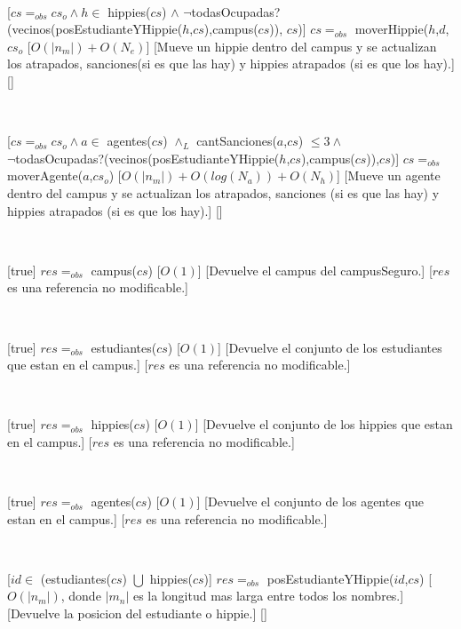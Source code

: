 ~

[$cs =_{obs} cs_o \land h \in$ hippies($cs$) $\land$ $\neg$todasOcupadas?(vecinos(posEstudianteYHippie($h$,$cs$),campus($cs$)), $cs$)]
{$cs =_{obs}$ moverHippie($h$,$d$,$cs_o$}
[$O(|n_m|) + O(N_e)$]
[Mueve un hippie dentro del campus y se actualizan los atrapados, sanciones(si es que las hay) y hippies atrapados (si es que los hay).]
[]

~

[$cs =_{obs} cs_o \land a \in$ agentes($cs$) $\land_L$ cantSanciones($a$,$cs$) $\leq 3 \land$ \\
$\neg$todasOcupadas?(vecinos(posEstudianteYHippie($h$,$cs$),campus($cs$)),$cs$)]
{$cs =_{obs}$ moverAgente($a$,$cs_o$)}
[$O(|n_m|) + O(log(N_a)) + O(N_h)$]
[Mueve un agente dentro del campus y se actualizan los atrapados, sanciones (si es que las hay) y hippies atrapados (si es que los hay).]
[]

~

[true]
{$res =_{obs}$ campus($cs$)}
[$O(1)$]
[Devuelve el campus del campusSeguro.]
[$res$ es una referencia no modificable.]

~

[true]
{$res =_{obs}$ estudiantes($cs$)}
[$O(1)$]
[Devuelve el conjunto de los estudiantes que estan en el campus.]
[$res$ es una referencia no modificable.]

~

[true]
{$res =_{obs}$ hippies($cs$)}
[$O(1)$]
[Devuelve el conjunto de los hippies que estan en el campus.]
[$res$ es una referencia no modificable.]

~

[true]
{$res =_{obs}$ agentes($cs$)}
[$O(1)$]
[Devuelve el conjunto de los agentes que estan en el campus.]
[$res$ es una referencia no modificable.]

~

[$id \in$ (estudiantes($cs$) $\bigcup$ hippies($cs$)]
{$res =_{obs}$ posEstudianteYHippie($id$,$cs$)}
[$O(|n_m|)$, donde $|m_n|$ es la longitud mas larga entre todos los nombres.]
[Devuelve la posicion del estudiante o hippie.]
[]

